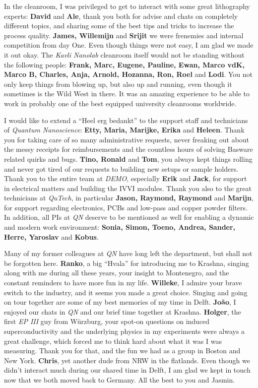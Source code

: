 In the cleanroom, I was privileged to get to interact with some great lithography experts:
%
\textbf{David} and \textbf{Ale}, thank you both for advise and chats on completely different topics, and sharing some of the best tips and tricks to increase the process quality.
%
\textbf{James, Willemijn} and \textbf{Srijit} we were frenemies and internal competition from day One.
%
Even though things were not easy, I am glad we made it out okay.
%
The \textit{Kavli Nanolab} cleanroom itself would not be standing without the following people:
%
\textbf{Frank, Marc, Eugene, Pauline, Ewan, Marco vdK, Marco B, Charles, Anja, Arnold, Hozanna, Ron, Roel} and \textbf{Lodi}.
%
You not only keep things from blowing up, but also up and running, even though it sometimes is the Wild West in there.
%
It was an amazing experience to be able to work in probably one of the best equipped university cleanrooms worldwide.

I would like to extend a \enquote{Heel erg bedankt} to the support staff and technicians of \textit{Quantum Nanoscience}:
%
\textbf{Etty, Maria, Marijke, Erika} and \textbf{Heleen}.
%
Thank you for taking care of so many administrative requests, never freaking out about the messy receipts for reimbursements and the countless hours of solving Basware related quirks and bugs.
%
\textbf{Tino, Ronald} and \textbf{Tom}, you always kept things rolling and never got tired of our requests to building new setups or sample holders.
%
Thank you to the entire team at \textit{DEMO}, especially \textbf{Erik} and \textbf{Jack}, for support in electrical matters and building the IVVI modules.
%
Thank you also to the great technicians at \textit{QuTech}, in particular \textbf{Jason, Raymond, Raymond} and \textbf{Marijn}, for support regarding electronics, PCBs and low-pass and copper powder filters.
%
In addition, all PIs at \textit{QN} deserve to be mentioned as well for enabling a dynamic and modern work environment:
%
\textbf{Sonia, Simon, Toeno, Andrea, Sander, Herre, Yaroslav} and \textbf{Kobus}.
	
Many of my former colleagues at \textit{QN} have long left the department, but shall not be forgotten here.
%
\textbf{Ranko}, a big \enquote{Hvala} for introducing me to Krashna, singing along with me during all these years, your insight to Montenegro, and the constant reminders to have more fun in my life.
%
\textbf{Willeke}, I admire your brave switch to the industry, and it seems you made a great choice.
%
Singing and going on tour together are some of my best memories of my time in Delft. 
%
\textbf{João}, I enjoyed our chats in \textit{QN} and our brief time together at Krashna.
%
\textbf{Holger}, the first \textit{EP III} guy from Würzburg, your spot-on questions on induced superconductivity and the underlying physics in my experiments were always a great challenge, which forced me to think hard about what it was I was measuring.
%
Thank you for that, and the fun we had as a group in Boston and New York.
%
\textbf{Chris}, yet another dude from NRW in the flatlands.
%
Even though we didn't interact much during our shared time in Delft, I am glad we kept in touch now that we both moved back to Germany.
%
All the best to you and Jasmin.

